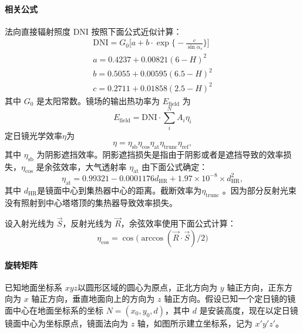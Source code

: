 \documentclass[../main.tex]{subfiles}
\begin{document}
\paragraph{相关公式}
法向直接辐射照度 DNI 按照下面公式近似计算：
\begin{equation}
\begin{aligned}
\mathrm{DNI} = G_{0} \bigg[ a + b \cdot \exp\Big\{{-}\frac{c}{\sin \alpha_{s}}\Big\}\bigg]\\
a = 0.4237 + 0.00821 (6 - H) ^{2} \\
b = 0.5055 + 0.00595(6.5 - H) ^{2} \\
c = 0.2711 + 0.01858 (2.5 - H) ^{2}
\end{aligned}
\end{equation}
其中 \(G_{0}\) 是太阳常数。镜场的输出热功率为 \(E_{\mathrm{field}}\) 为
\begin{equation}
E_{\mathrm{field}} = \mathrm{DNI} \cdot \sum _{i} ^{N} A_{i} \eta _{i}
\end{equation}
定日镜光学效率\(\eta\)为
\begin{equation}
\eta = \eta _{\mathrm{s b}} \eta _{\cos} \eta _{\mathrm{at}} \eta _{\mathrm{trunc}} \eta _{\mathrm{ref}},
\end{equation}
其中 \(\eta _{\mathrm{s b}}\) 为阴影遮挡效率。阴影遮挡损失是指由于阴影或者是遮挡导致的效率损失，\(\eta _{\cos}\) 是余弦效率，大气透射率 \(\eta _{\mathrm{at}}\) 由下面公式确定：
\begin{equation}
\eta _{\mathrm{at}} = 0.99321 - 0.0001176 d _{\mathrm{HR}} + 1.97 \times 10 ^{-8} \times d _{\mathrm{HR}} ^{2},
\end{equation}
其中 \(d _{\mathrm{HR}}\)是镜面中心到集热器中心的距离。截断效率为\(\eta _{\mathrm{trunc}}\) 。因为部分反射光束没有照射到中心塔塔顶的集热器导致效率损失。

设入射光线为 \(\vec S\)，反射光线为 \(\vec R\)，余弦效率使用下面公式计算：
\begin{equation}
\eta _{\cos} = \cos \big(\arccos (\vec R \cdot \vec S) / 2\big)
\end{equation}
\paragraph{旋转矩阵}
已知地面坐标系 \(x y z\)以圆形区域的圆心为原点，正北方向为 \(y\) 轴正方向，正东方向为 \(x\) 轴正方向，垂直地面向上的方向为 \(z\) 轴正方向。假设已知一个定日镜的镜面中心在地面坐标系的坐标 \(N = (x_0,  y_0 , d)\)，其中 \(d\) 是安装高度，现在以定日镜镜面中心为坐标原点，镜面法向为 \(z\) 轴，如图所示建立坐标系，记为 \(x'y'z'\)。
\end{document}
